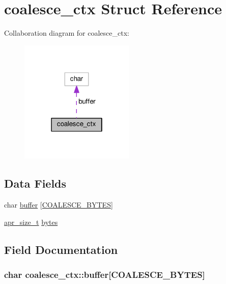 \hypertarget{structcoalesce__ctx}{}\section{coalesce\+\_\+ctx Struct Reference}
\label{structcoalesce__ctx}


Collaboration diagram for coalesce\+\_\+ctx\+:
\nopagebreak
\begin{figure}[H]
\begin{center}
\leavevmode
\includegraphics[width=154pt]{structcoalesce__ctx__coll__graph}
\end{center}
\end{figure}
\subsection*{Data Fields}
\begin{DoxyCompactItemize}
\item 
char \hyperlink{structcoalesce__ctx_acd3a517b24fc5cc1fdaf6ffff34f4e35}{buffer} \mbox{[}\hyperlink{ssl__engine__io_8c_ad488a56309e396dfd9793ad1e76e57b3}{C\+O\+A\+L\+E\+S\+C\+E\+\_\+\+B\+Y\+T\+ES}\mbox{]}
\item 
\hyperlink{group__apr__platform_gaaa72b2253f6f3032cefea5712a27540e}{apr\+\_\+size\+\_\+t} \hyperlink{structcoalesce__ctx_a69bb4d700d12cf1b91f3c9070e2e2aea}{bytes}
\end{DoxyCompactItemize}


\subsection{Field Documentation}
\subsubsection[{\texorpdfstring{buffer}{buffer}}]{\setlength{\rightskip}{0pt plus 5cm}char coalesce\+\_\+ctx\+::buffer\mbox{[}{\bf C\+O\+A\+L\+E\+S\+C\+E\+\_\+\+B\+Y\+T\+ES}\mbox{]}}\hypertarget{structcoalesce__ctx_acd3a517b24fc5cc1fdaf6ffff34f4e35}{}\label{structcoalesce__ctx_acd3a517b24fc5cc1fdaf6ffff34f4e35}
